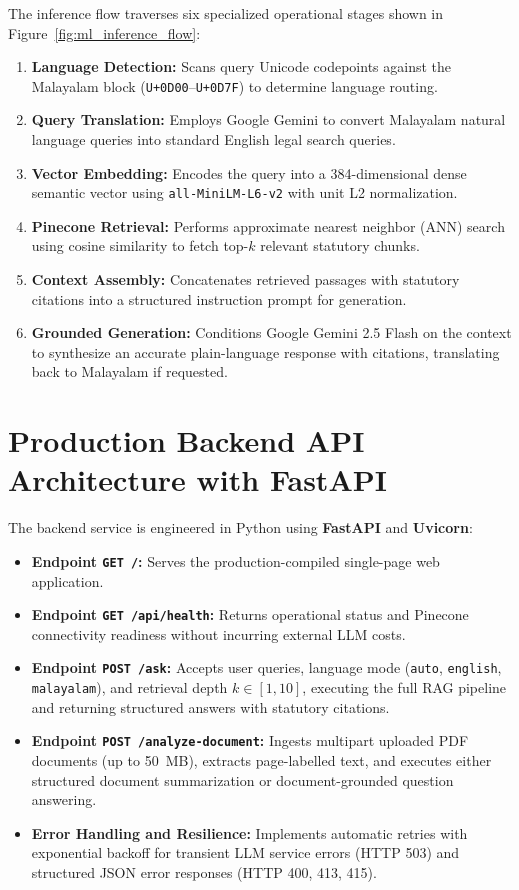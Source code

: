 \documentclass[12pt,a4paper]{report}
\begin{document}
The inference flow traverses six specialized operational stages shown in Figure~\ref{fig:ml_inference_flow}:
\begin{enumerate}
    \item \textbf{Language Detection:} Scans query Unicode codepoints against the Malayalam block (\texttt{U+0D00}--\texttt{U+0D7F}) to determine language routing.
    \item \textbf{Query Translation:} Employs Google Gemini to convert Malayalam natural language queries into standard English legal search queries.
    \item \textbf{Vector Embedding:} Encodes the query into a 384-dimensional dense semantic vector using \texttt{all-MiniLM-L6-v2} with unit L2 normalization.
    \item \textbf{Pinecone Retrieval:} Performs approximate nearest neighbor (ANN) search using cosine similarity to fetch top-$k$ relevant statutory chunks.
    \item \textbf{Context Assembly:} Concatenates retrieved passages with statutory citations into a structured instruction prompt for generation.
    \item \textbf{Grounded Generation:} Conditions Google Gemini 2.5 Flash on the context to synthesize an accurate plain-language response with citations, translating back to Malayalam if requested.
\end{enumerate}

\section{Production Backend API Architecture with FastAPI}
The backend service is engineered in Python using \textbf{FastAPI} and \textbf{Uvicorn}:
\begin{itemize}
    \item \textbf{Endpoint \texttt{GET /}:} Serves the production-compiled single-page web application.
    \item \textbf{Endpoint \texttt{GET /api/health}:} Returns operational status and Pinecone connectivity readiness without incurring external LLM costs.
    \item \textbf{Endpoint \texttt{POST /ask}:} Accepts user queries, language mode (\texttt{auto}, \texttt{english}, \texttt{malayalam}), and retrieval depth $k \in [1, 10]$, executing the full RAG pipeline and returning structured answers with statutory citations.
    \item \textbf{Endpoint \texttt{POST /analyze-document}:} Ingests multipart uploaded PDF documents (up to 50~MB), extracts page-labelled text, and executes either structured document summarization or document-grounded question answering.
    \item \textbf{Error Handling and Resilience:} Implements automatic retries with exponential backoff for transient LLM service errors (HTTP 503) and structured JSON error responses (HTTP 400, 413, 415).
\end{itemize}
\end{document}
